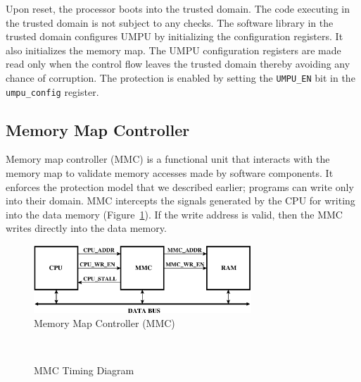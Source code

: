 Upon reset, the processor boots into the trusted domain.
%
The code executing in the trusted domain is not subject to any checks.
%
The software library in the trusted domain configures UMPU by
initializing the configuration registers.
%
It also initializes the memory map.
%
The UMPU configuration registers are made read only when the control
flow leaves the trusted domain thereby avoiding any chance of
corruption.
%
The protection is enabled by setting the \texttt{UMPU\_EN} bit in the
\texttt{umpu\_config} register.
%
%
\subsection{Memory Map Controller}
\label{sec:mmc}
%
Memory map controller (MMC) is a functional unit that interacts with
the memory map to validate memory accesses made by software
components.
%
It enforces the protection model that we described earlier; programs
can write only into their domain.
%
MMC intercepts the signals generated by the CPU for writing into the
data memory (Figure~\ref{fig:mmcramcpu}).
%
If the write address is valid, then the MMC writes directly into the
data memory.
%
\begin{figure}[htbp]
   \centering
   \includegraphics[height=1in,
   keepaspectratio=true]{figures/mmcramcpu.eps} 
   \caption{Memory Map Controller (MMC)}
   \label{fig:mmcramcpu}
\end{figure}
%
\begin{figure}[htpb]
 \centering
  \mbox{
    \hspace{0.2in}
  }
  \caption{MMC Timing Diagram}
\end{figure}   
